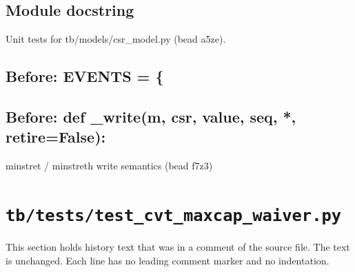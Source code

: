 \begin{record}

\subsection*{Module docstring}

\begin{textblock}
Unit tests for tb/models/csr_model.py (bead a5ze).
\end{textblock}

\subsection*{Before: EVENTS = \{}


\subsection*{Before: def \_write(m, csr, value, seq, *, retire=False):}

\begin{textblock}
minstret / minstreth write semantics (bead f7z3)
\end{textblock}

\end{record}

\section{\texttt{tb/tests/test\_cvt\_maxcap\_waiver.py}}\label{cr:suite:test-cvt-maxcap-waiver}

This section holds history text that was in a comment of the source file. The text is unchanged. Each line has no leading comment marker and no indentation.


